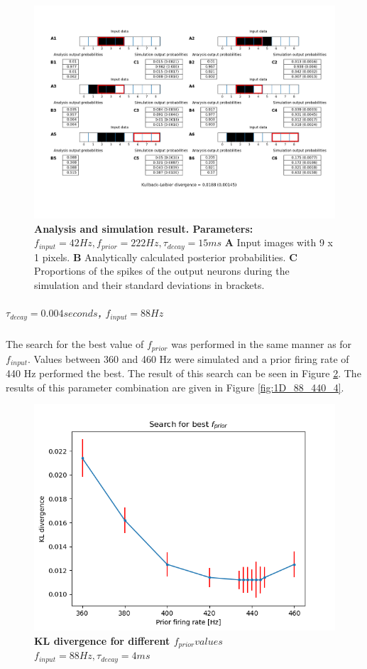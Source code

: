 \begin{figure}
  \includegraphics[width=\linewidth]{figures/1D/1D_42_222_15.png}
  \caption{\textbf{Analysis and simulation result. Parameters: } $f_{input} = 42 Hz, f_{prior} = 222 Hz, \tau_{decay} = 15 ms$ \textbf{A} Input images with 9 x 1 pixels. \textbf{B} Analytically calculated posterior probabilities. \textbf{C} Proportions of the spikes of the output neurons during the simulation and their standard deviations in brackets.}
  \label{fig:1D_42_222_15}
\end{figure}

\subparagraph{$\tau_{decay} = 0.004 seconds$, $f_{input} = 88 Hz$}
The search for the best value of $f_{prior}$ was performed in the same manner as for $f_{input}$. Values between 360 and 460 Hz were simulated and a prior firing rate of 440 Hz performed the best. The result of this search can be seen in Figure \ref{fig:1D_KLD_fInput88_tau4}. The results of this parameter combination are given in Figure \ref{fig:1D_88_440_4}.

\begin{figure}
  \includegraphics[width=\linewidth]{figures/1D/KLDvsfPrior_fInput88tau4.png}
  \caption{\textbf{KL divergence for different $f_{prior} values$} $f_{input} = 88 Hz, \tau_{decay} = 4 ms$}
  \label{fig:1D_KLD_fInput88_tau4}
\end{figure}

